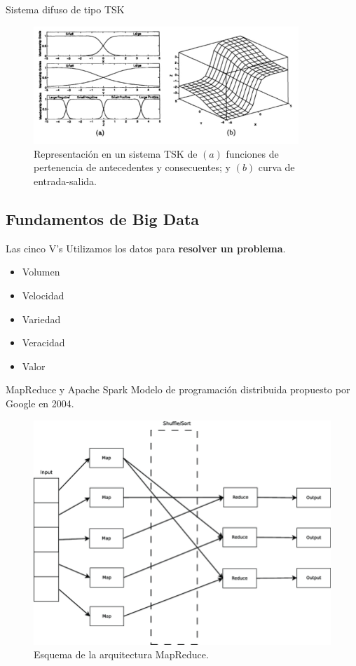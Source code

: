 \documentclass[10pt, spanish]{beamer}
\begin{document}
\begin{frame}{Sistema difuso de tipo TSK}
\begin{figure}
	\centering
	\includegraphics[width=27em]{img/tsk}
	\caption{\footnotesize Representación en un sistema TSK de $(a)$ funciones de pertenencia de antecedentes y consecuentes; y $(b)$ curva de entrada-salida.}
\end{figure}
\end{frame}


\subsection{Fundamentos de Big Data}

\begin{frame}{Las cinco V's}
  Utilizamos los datos para \textbf{resolver un problema}.

\begin{itemize}
  \item Volumen
  \item Velocidad
  \item Variedad
  \item Veracidad
  \item Valor
\end{itemize}
\end{frame}

\begin{frame}{MapReduce y Apache Spark}
  Modelo de programación distribuida propuesto por Google en 2004.

  \begin{figure}
	\centering
	\includegraphics[width=.6\textwidth]{img/mapreduce}
	\caption{\footnotesize Esquema de la arquitectura MapReduce.}
\end{figure}
\end{frame}
\end{document}
